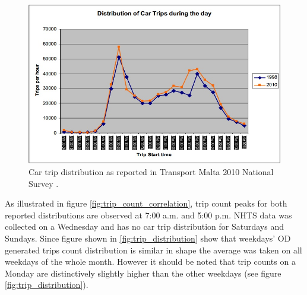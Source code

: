 \documentclass[12pt, a4paper]{report}
\theoremstyle{definition}
\theoremstyle{definition}%
\theoremstyle{definition}%
\theoremstyle{definition}%
\theoremstyle{definition}%
\theoremstyle{definition}%
\begin{document}
\begin{figure}[!]	
	\includegraphics[scale=0.6]{Transport_malta_trip_distribution.jpg}
	\centering
	\caption[NHTS car trip distribution]{Car trip distribution as reported in Transport Malta 2010 National Survey \cite{malta2011national}.}
	\label{fig:trip_distribution_nso}
\end{figure}

As illustrated in figure \ref{fig:trip_count_correlation}, trip count peaks for both reported distributions are observed at 7:00 a.m. and 5:00 p.m. NHTS data was collected on a Wednesday and has no car trip distribution for Saturdays and Sundays. Since figure shown in \ref{fig:trip_distribution} show that weekdays' OD generated trips count distribution is similar in shape the average was taken on all weekdays of the whole month. However it should be noted that trip counts on a Monday are distinctively slightly higher than the other weekdays (see figure \ref{fig:trip_distribution}). 


\begin{table}[!] 	
	\centering
	\caption[NHTS and OD trip distributions correlation statistics]{NHTS and OD trip distributions proved to be highly correlated. $ ^* p < 0.001$  } 
	\label{table:trip_dsitribution_statistical_analysis}	
\end{table}
\end{document}
